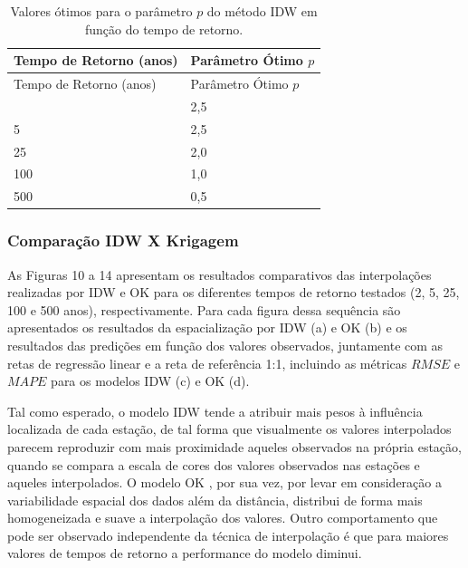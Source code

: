 \documentclass[
]{agujournal2019}
\begin{document}
\begin{longtable}[]{@{}ll@{}}
\caption{Valores ótimos para o parâmetro \(p\) do método IDW em função
do tempo de retorno.}\label{tbl-Tab6}\tabularnewline
\toprule\noalign{}
Tempo de Retorno (anos) & Parâmetro Ótimo \(p\) \\
\midrule\noalign{}
\endfirsthead
\toprule\noalign{}
Tempo de Retorno (anos) & Parâmetro Ótimo \(p\) \\
\midrule\noalign{}
\endhead
\bottomrule\noalign{}
\endlastfoot
2 & 2,5 \\
5 & 2,5 \\
25 & 2,0 \\
100 & 1,0 \\
500 & 0,5 \\
\end{longtable}

\subsubsection{Comparação IDW X
Krigagem}\label{comparauxe7uxe3o-idw-x-krigagem}

As Figuras 10 a 14 apresentam os resultados comparativos das
interpolações realizadas por IDW e OK para os diferentes tempos de
retorno testados (2, 5, 25, 100 e 500 anos), respectivamente. Para cada
figura dessa sequência são apresentados os resultados da espacialização
por IDW (a) e OK (b) e os resultados das predições em função dos valores
observados, juntamente com as retas de regressão linear e a reta de
referência 1:1, incluindo as métricas \(RMSE\) e \(MAPE\) para os
modelos IDW (c) e OK (d).

Tal como esperado, o modelo IDW tende a atribuir mais pesos à influência
localizada de cada estação, de tal forma que visualmente os valores
interpolados parecem reproduzir com mais proximidade aqueles observados
na própria estação, quando se compara a escala de cores dos valores
observados nas estações e aqueles interpolados. O modelo OK , por sua
vez, por levar em consideração a variabilidade espacial dos dados além
da distância, distribui de forma mais homogeneizada e suave a
interpolação dos valores. Outro comportamento que pode ser observado
independente da técnica de interpolação é que para maiores valores de
tempos de retorno a performance do modelo diminui.
\end{document}
